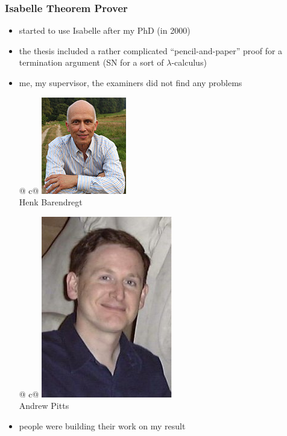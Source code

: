 \documentclass[dvipsnames,14pt,t]{beamer}
\begin{document}
\begin{frame}[c]
\frametitle{\Large Isabelle Theorem Prover}

\begin{itemize}
\item started to use Isabelle after my PhD (in 2000)

\item the thesis included a rather complicated
      ``pencil-and-paper'' proof for a termination argument
      (SN for a sort of $\lambda$-calculus)\medskip
 
\item me, my supervisor, the examiners did not find any problems\medskip 
 \begin{center}
  \begin{tabular}{@ {}c@ {}}
  \includegraphics[scale=0.38]{pics/barendregt.jpg}\\[-2mm]
  \footnotesize Henk Barendregt
  \end{tabular}
  \hspace{2mm}
  \begin{tabular}{@ {}c@ {}}
  \includegraphics[scale=0.20]{pics/andrewpitts.jpg}\\[-2mm]
  \footnotesize Andrew Pitts
  \end{tabular}
  \end{center}
  
\item people were building their work on my result      
  
\end{itemize}

\end{frame}
\end{document}
